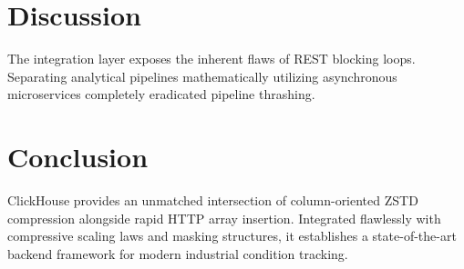 \documentclass[10pt,twocolumn,letterpaper]{article}
\begin{document}
\section{Discussion}
The integration layer exposes the inherent flaws of REST blocking loops. Separating analytical pipelines mathematically utilizing asynchronous microservices completely eradicated pipeline thrashing.

\section{Conclusion}
ClickHouse provides an unmatched intersection of column-oriented ZSTD compression alongside rapid HTTP array insertion. Integrated flawlessly with compressive scaling laws and masking structures, it establishes a state-of-the-art backend framework for modern industrial condition tracking.
\end{document}
